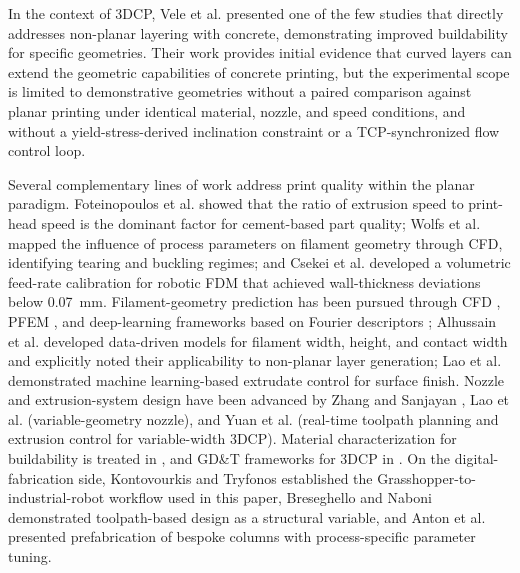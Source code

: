 \documentclass[conference]{IEEEtran}
\begin{document}
In the context of 3DCP, Vele et al. \cite{vele_enhancing_2024} presented one of the few studies that directly addresses non-planar layering with concrete, demonstrating improved buildability for specific geometries. Their work provides initial evidence that curved layers can extend the geometric capabilities of concrete printing, but the experimental scope is limited to demonstrative geometries without a paired comparison against planar printing under identical material, nozzle, and speed conditions, and without a yield-stress-derived inclination constraint or a TCP-synchronized flow control loop.

Several complementary lines of work address print quality within the planar paradigm. Foteinopoulos et al. \cite{foteinopoulos_cement-based_2020} showed that the ratio of extrusion speed to print-head speed is the dominant factor for cement-based part quality; Wolfs et al. \cite{wolfs_filament_2021} mapped the influence of process parameters on filament geometry through CFD, identifying tearing and buckling regimes; and Csekei et al. \cite{csekei_optimization_2025} developed a volumetric feed-rate calibration for robotic FDM that achieved wall-thickness deviations below 0.07~mm. Filament-geometry prediction has been pursued through CFD \cite{COMMINAL2020106256}, PFEM \cite{reinold_extrusion_2022}, and deep-learning frameworks based on Fourier descriptors \cite{rizzieri_shapegen3dcp_2026}; Alhussain et al. \cite{alhussain_developing_2024} developed data-driven models for filament width, height, and contact width and explicitly noted their applicability to non-planar layer generation; Lao et al. \cite{lao_improving_2020} demonstrated machine learning-based extrudate control for surface finish. Nozzle and extrusion-system design have been advanced by Zhang and Sanjayan \cite{zhang_extrusion_2023, zhang_pumping-less_2024}, Lao et al. \cite{lao_variable-geometry_2021} (variable-geometry nozzle), and Yuan et al. \cite{yuan_real-time_2022} (real-time toolpath planning and extrusion control for variable-width 3DCP). Material characterization for buildability is treated in \cite{bos_juxtaposing_2021, ducoulombier_slugs-test_2021, bao_testing_2024, rehman_recommendations_2023, khan_impact_2024}, and GD\&T frameworks for 3DCP in \cite{xu_inspecting_2020}. On the digital-fabrication side, Kontovourkis and Tryfonos \cite{kontovourkis_integrating_2018} established the Grasshopper-to-industrial-robot workflow used in this paper, Breseghello and Naboni \cite{breseghello_toolpath-based_2022} demonstrated toolpath-based design as a structural variable, and Anton et al. \cite{anton_3d_2021} presented prefabrication of bespoke columns with process-specific parameter tuning.
\end{document}
